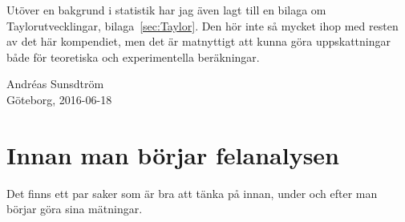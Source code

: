 \documentclass[11pt,a4paper, swedish
]{article}
\begin{document}
Utöver en bakgrund i statistik har jag även lagt till en bilaga om
Taylorutvecklingar, bilaga~\ref{sec:Taylor}. Den hör inte så mycket
ihop med resten av det här kompendiet, men det är matnyttigt att kunna
göra uppskattningar både för teoretiska och experimentella beräkningar. 

\begin{flushright}
Andréas Sunsdtröm\\ 
Göteborg, 2016-06-18
\end{flushright}
\normalsize


\thispagestyle{empty}
\clearpage
\thispagestyle{empty}
\tableofcontents

\clearpage
\setcounter{page}{1}


\section{Innan man börjar felanalysen}
Det finns ett par saker som är bra att tänka på innan, under och efter
man börjar göra sina mätningar.
\end{document}
